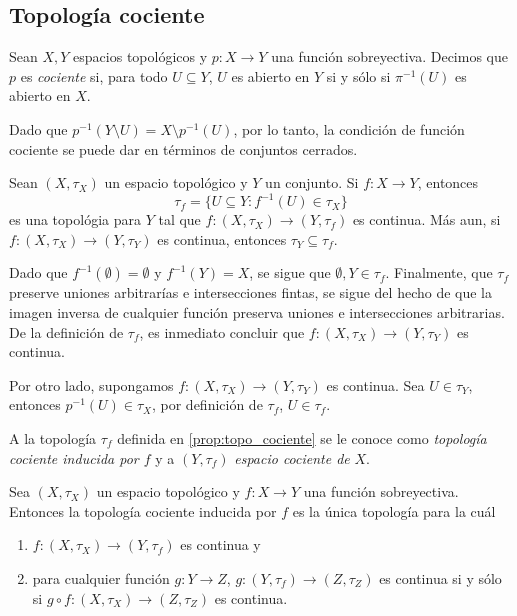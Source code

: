 \subsection{Topología cociente}
\begin{definicion}
    Sean $X,Y$ espacios topológicos y $p:X\to Y$ una función sobreyectiva. Decimos que $p$ es \textit{cociente} si, para todo $U\subseteq Y$, 
     $U$ es abierto en $Y$ si y sólo si $\pi^{-1}(U)$ es abierto en $X$.
\end{definicion}
\begin{obs}
    Dado que $p^{-1}(Y\setminus U)=X\setminus p^{-1}(U)$, por lo tanto, la condición de función cociente se puede dar en términos de conjuntos cerrados.
\end{obs}
\begin{prop}
\label{prop:topo_cociente}
    Sean $(X,\tau_X)$ un espacio topológico y $Y$ un conjunto. Si $f:X\to Y$, entonces
    \[
    \tau_f=\{U\subseteq Y:f^{-1}(U)\in\tau_X\}
    \]
    es una topológia para $Y$ tal que $f:(X,\tau_X)\to(Y,\tau_f)$ es continua. Más aun, si $f:(X,\tau_X)\to(Y,\tau_Y)$ es continua, entonces $\tau_Y\subseteq \tau_f$.
\end{prop}
\begin{dem}
    Dado que $f^{-1}(\emptyset)=\emptyset$ y $f^{-1}(Y)=X$, se sigue que $\emptyset,Y\in\tau_f$. Finalmente, que $\tau_f$ preserve uniones arbitrarías e intersecciones fintas, se sigue del hecho de que la imagen inversa de cualquier función preserva uniones e intersecciones arbitrarias. De la definición de $\tau_f$, es inmediato concluir que $f:(X,\tau_X)\to(Y,\tau_Y)$ es continua.

    Por otro lado, supongamos $f:(X,\tau_X)\to(Y,\tau_Y)$ es continua. Sea $U\in\tau_Y$, entonces $p^{-1}(U)\in \tau_X$, por definición de $\tau_f$, $U\in \tau_{f}$.
\end{dem}
\begin{definicion}
    A la topología $\tau_f$ definida en \ref{prop:topo_cociente} se le conoce como \textit{topología cociente inducida por $f$} y a $(Y,\tau_f)$ \textit{espacio cociente de} $X$.
\end{definicion}
\begin{prop}
\label{prop:unicidad_espacio_cociente}
    Sea $(X,\tau_X)$ un espacio topológico y $f:X\to Y$ una función sobreyectiva. Entonces la topología cociente inducida por $f$ es la única topología para la cuál 
    \begin{enumerate}[label=(\arabic*)]
        \item\label{item:f_continua} $f:(X,\tau_X)\to (Y,\tau_f)$ es continua y
        \item\label{item:g_continua} para cualquier función $g:Y\to Z$, $g: (Y,\tau_f)\to(Z,\tau_Z)$ es continua si y sólo si $g\circ f:(X,\tau_X)\to (Z,\tau_Z)$ es continua. 
    \end{enumerate}
\end{prop}
